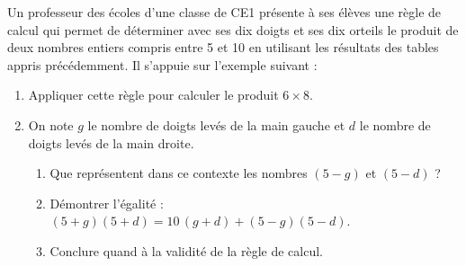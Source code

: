 Un professeur des écoles d’une classe de CE1 présente à ses élèves une règle de calcul qui permet de déterminer avec ses dix doigts et ses dix orteils le produit de deux nombres entiers compris entre 5 et 10 en utilisant les résultats des tables appris précédemment. Il s’appuie sur l’exemple suivant :
\begin{center}
\end{center}
\begin{enumerate}
   \setlength{\itemsep}{-1mm}
   \item Appliquer cette règle pour calculer le produit $6\times8$.
   \item On note $g$ le nombre de doigts levés de la main gauche et $d$ le nombre de doigts levés de la main droite.
      \begin{enumerate}
         \item Que représentent dans ce contexte les nombres $(5-g)$ et $(5-d)$ ?
         \item Démontrer l’égalité : $(5+g)(5+d) =10\,(g+d)+(5-g)(5-d)$.
         \item Conclure quand à la validité de la règle de calcul.
      \end{enumerate}
\end{enumerate}